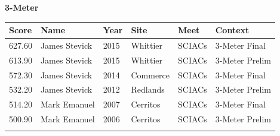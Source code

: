 \noindent\begin{minipage}[t]{0.98\textwidth}
\centering
\textbf{\textcolor{teamprimary}{3-Meter}}\par
\vspace{0.5em}
\centering
\small
\renewcommand{\arraystretch}{1.0}
\setlength{\tabcolsep}{4pt}
\begin{tabular}{@{}p{2.0cm}p{3.2cm}p{1.2cm}p{2.0cm}p{2.0cm}p{2.5cm}@{}}
\toprule
\textbf{Score} & \textbf{Name} & \textbf{Year} & \textbf{Site} & \textbf{Meet} & \textbf{Context} \\
\midrule
627.60 & James Stevick & 2015 & Whittier & SCIACs & 3-Meter Final \\
613.90 & James Stevick & 2015 & Whittier & SCIACs & 3-Meter Prelim \\
572.30 & James Stevick & 2014 & Commerce & SCIACs & 3-Meter Final \\
532.20 & James Stevick & 2012 & Redlands & SCIACs & 3-Meter Prelim \\
514.20 & Mark Emanuel & 2007 & Cerritos & SCIACs & 3-Meter Final \\
500.90 & Mark Emanuel & 2006 & Cerritos & SCIACs & 3-Meter Prelim \\
\bottomrule
\vspace{0.5em}
\end{tabular}
\end{minipage}
\vspace{1.2em}
